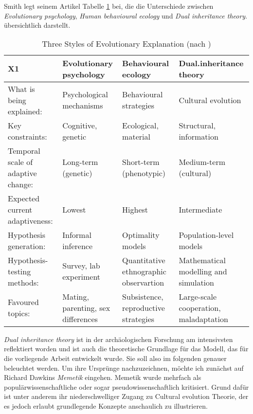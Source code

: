 \documentclass[openany,twoside,twocolumn]{book}
\begin{document}
Smith legt seinem Artikel Tabelle \ref{tab:smiththreestyles} bei, die
die Unterschiede zwischen \emph{Evolutionary psychology}, \emph{Human
behavioural ecology} und \emph{Dual inheritance theory}. übersichtlich
darstellt.

\begin{table}

\caption{\label{tab:smiththreestyles}Three Styles of Evolutionary Explanation (nach \textcite{SmithThreestylesevolutionary2000})}
\centering
\begin{tabular}[t]{>{\raggedright\arraybackslash}p{15em}>{\raggedright\arraybackslash}p{10em}>{\raggedright\arraybackslash}p{10em}>{\raggedright\arraybackslash}p{10em}}
\toprule
X1 & Evolutionary psychology & Behavioural ecology & Dual.inheritance theory\\
\midrule
What is being explained: & Psychological mechanisms & Behavioural strategies & Cultural evolution\\
Key constraints: & Cognitive, genetic & Ecological, material & Structural, information\\
Temporal scale of adaptive change: & Long-term (genetic) & Short-term (phenotypic) & Medium-term (cultural)\\
Expected current adaptiveness: & Lowest & Highest & Intermediate\\
Hypothesis generation: & Informal inference & Optimality models & Population-level models\\
\addlinespace
Hypothesis-testing methods: & Survey, lab experiment & Quantitative ethnographic observartion & Mathematical modelling and simulation\\
Favoured topics: & Mating, parenting, sex differences & Subsistence, reproductive strategies & Large-scale cooperation, maladaptation\\
\bottomrule
\end{tabular}
\end{table}

\emph{Dual inheritance theory} ist in der archäologischen Forschung am
intensivsten reflektiert worden und ist auch die theoretische Grundlage
für das Modell, das für die vorliegende Arbeit entwickelt wurde. Sie
soll also im folgenden genauer beleuchtet werden. Um ihre Ursprünge
nachzuzeichnen, möchte ich zunächst auf Richard Dawkins \emph{Memetik}
eingehen. Memetik wurde mehrfach als populärwissenschaftliche oder sogar
pseudowissenschaftlich kritisiert. Grund dafür ist unter anderem ihr
niederschwelliger Zugang zu Cultural evolution Theorie, der es jedoch
erlaubt grundlegende Konzepte anschaulich zu illustrieren.
\end{document}
